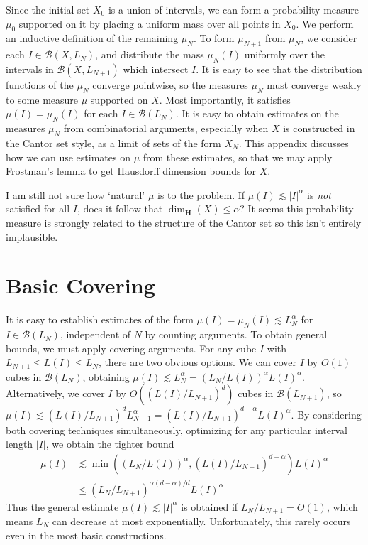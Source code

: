 Since the initial set $X_0$ is a union of intervals, we can form a probability measure $\mu_0$ supported on it by placing a uniform mass over all points in $X_0$. We perform an inductive definition of the remaining $\mu_N$. To form $\mu_{N+1}$ from $\mu_N$, we consider each $I \in \mathcal{B}(X,L_N)$, and distribute the mass $\mu_N(I)$ uniformly over the intervals in $\mathcal{B}(X,L_{N+1})$ which intersect $I$. It is easy to see that the distribution functions of the $\mu_N$ converge pointwise, so the measures $\mu_N$ must converge weakly to some measure $\mu$ supported on $X$. Most importantly, it satisfies $\mu(I) = \mu_N(I)$ for each $I \in \mathcal{B}(L_N)$. It is easy to obtain estimates on the measures $\mu_N$ from combinatorial arguments, especially when $X$ is constructed in the Cantor set style, as a limit of sets of the form $X_N$. This appendix discusses how we can use estimates on $\mu$ from these estimates, so that we may apply Frostman's lemma to get Hausdorff dimension bounds for $X$.

\begin{remark}
    I am still not sure how `natural' $\mu$ is to the problem. If $\mu(I) \lesssim |I|^\alpha$ is {\it not} satisfied for all $I$, does it follow that $\dim_{\mathbf{H}}(X) \leq \alpha$? It seems this probability measure is strongly related to the structure of the Cantor set so this isn't entirely implausible.
\end{remark}

\section{Basic Covering}

It is easy to establish estimates of the form $\mu(I) = \mu_N(I) \lesssim L_N^\alpha$ for $I \in \mathcal{B}(L_N)$, independent of $N$ by counting arguments. To obtain general bounds, we must apply covering arguments. For any cube $I$ with $L_{N+1} \leq L(I) \leq L_N$, there are two obvious options. We can cover $I$ by $O(1)$ cubes in $\mathcal{B}(L_N)$, obtaining $\mu(I) \lesssim L_N^\alpha = (L_N / L(I))^\alpha L(I)^\alpha$. Alternatively, we cover $I$ by $O((L(I) / L_{N+1})^d)$ cubes in $\mathcal{B}(L_{N+1})$, so $\mu(I) \lesssim (L(I) / L_{N+1})^d L_{N+1}^\alpha = (L(I) / L_{N+1})^{d - \alpha} L(I)^\alpha$. By considering both covering techniques simultaneously, optimizing for any particular interval length $|I|$, we obtain the tighter bound
%
\begin{align*}
    \mu(I) &\lesssim \min\left( (L_N/L(I))^\alpha, (L(I)/L_{N+1})^{d - \alpha} \right) L(I)^\alpha\\
    &\leq (L_N/L_{N+1})^{\alpha(d - \alpha)/d} L(I)^\alpha
\end{align*}
%
Thus the general estimate $\mu(I) \lesssim |I|^\alpha$ is obtained if $L_N/L_{N+1} = O(1)$, which means $L_N$ can decrease at most exponentially. Unfortunately, this rarely occurs even in the most basic constructions.

